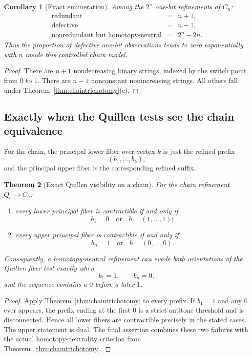 \documentclass[11pt]{article}
\newtheorem{theorem}{Theorem}[section]
\newtheorem{corollary}[theorem]{Corollary}
\theoremstyle{definition}
\begin{document}
\begin{corollary}[Exact enumeration]\label{cor:chaincounts}
Among the $2^n$ one-bit refinements of $C_n$:
\[
\begin{array}{rcl}
\text{redundant} &=& n+1,\\
\text{defective} &=& n-1,\\
\text{nonredundant but homotopy-neutral} &=& 2^n-2n.
\end{array}
\]
Thus the proportion of defective one-bit observations tends to zero exponentially with $n$ inside this controlled chain model.
\end{corollary}

\begin{proof}
There are $n+1$ nondecreasing binary strings, indexed by the switch point from $0$ to $1$. There are $n-1$ nonconstant nonincreasing strings. All others fall under Theorem~\ref{thm:chaintrichotomy}(c).
\end{proof}

\subsection{Exactly when the Quillen tests see the chain equivalence}

For the chain, the principal lower fiber over vertex $k$ is just the refined prefix
\[
(b_1,\dots,b_k),
\]
and the principal upper fiber is the corresponding refined suffix.

\begin{theorem}[Exact Quillen visibility on a chain]\label{thm:chainquillen}
For the chain refinement $Q_b\to C_n$:
\begin{enumerate}[label=(\roman*)]
\item every lower principal fiber is contractible if and only if
\[
b_1=0\quad\text{or}\quad b=(1,\dots,1);
\]
\item every upper principal fiber is contractible if and only if
\[
b_n=1\quad\text{or}\quad b=(0,\dots,0).
\]
\end{enumerate}
Consequently, a homotopy-neutral refinement can evade \emph{both} orientations of the Quillen fiber test exactly when
\[
b_1=1,\qquad b_n=0,
\]
and the sequence contains a $0$ before a later $1$.
\end{theorem}

\begin{proof}
Apply Theorem~\ref{thm:chaintrichotomy} to every prefix. If $b_1=1$ and any $0$ ever appears, the prefix ending at the first $0$ is a strict antitone threshold and is disconnected. Hence all lower fibers are contractible precisely in the stated cases. The upper statement is dual. The final assertion combines these two failures with the actual homotopy-neutrality criterion from Theorem~\ref{thm:chaintrichotomy}.
\end{proof}
\end{document}
